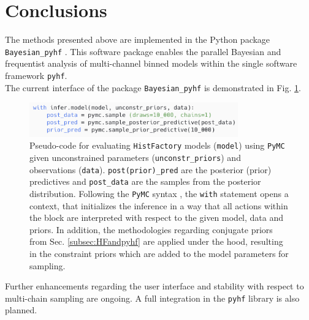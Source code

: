 \section{Conclusions}\label{sec:conclusions}

The methods presented above are implemented in the Python package \texttt{Bayesian\_pyhf} \cite{BayesianPyhf}. This software package enables the parallel Bayesian and frequentist analysis of multi-channel binned models within the single software framework \texttt{pyhf}.\\
The current interface of the package \texttt{Bayesian\_pyhf} is demonstrated in Fig. \ref{code}.
    \begin{figure} %
        \centering
        \includegraphics[width=9cm]{figures/code2.png}
        \centering
        \caption{Pseudo-code for evaluating \texttt{HistFactory} models (\texttt{model}) using \texttt{PyMC} given unconstrained parameters (\texttt{unconstr\_priors}) and observations (\texttt{data}). \texttt{post(prior)\_pred} are the posterior (prior) predictives and \texttt{post\_data} are the samples from the posterior distribution. Following the \texttt{PyMC} syntax \cite{PyMC}, the \texttt{with} statement opens a context, that initializes the inference in a way that all actions within the block are interpreted with respect to the given model, data and priors. In addition, the methodologies regarding conjugate priors from Sec. \ref{subsec:HFandpyhf} are applied under the hood, resulting in the constraint priors which are added to the model parameters for sampling.}
        \label{code}
    \end{figure}
\noindent Further enhancements regarding the user interface and stability with respect to multi-chain sampling are ongoing. A full integration in the \texttt{pyhf} library is also planned.
